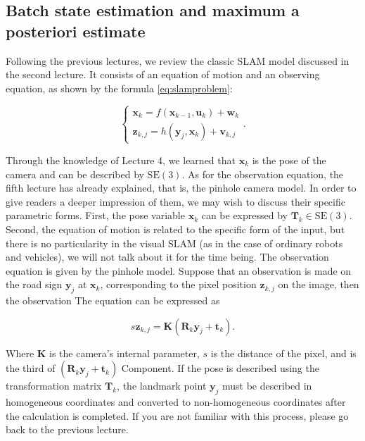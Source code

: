 \subsection{Batch state estimation and maximum a posteriori estimate}

Following the previous lectures, we review the classic SLAM model discussed in the second lecture. It consists of an equation of motion and an observing equation, as shown by the formula \eqref{eq:slamproblem}:

\begin{equation}
\left\{ \begin{array}{l}
{\bm{x}_k} = f\left( {{\bm{x}_{k - 1}},{\bm{u}_k}} \right) + \bm{w}_k\\
{\bm{z}_{k,j}} = h\left( {{ \bm{y}_j},{ \bm{x}_k}}  \right)+ \bm{v}_{k,j}
\end{array} \right. .
\end{equation}

Through the knowledge of Lecture 4, we learned that $\bm{x}_k$ is the pose of the camera and can be described by $\mathrm{SE}(3)$. As for the observation equation, the fifth lecture has already explained, that is, the pinhole camera model. In order to give readers a deeper impression of them, we may wish to discuss their specific parametric forms. First, the pose variable $\bm{x}_k$ can be expressed by $\bm{T}_k \in \mathrm{SE}(3) $. Second, the equation of motion is related to the specific form of the input, but there is no particularity in the visual SLAM (as in the case of ordinary robots and vehicles), we will not talk about it for the time being. The observation equation is given by the pinhole model. Suppose that an observation is made on the road sign $\bm{y}_j$ at $\bm{x}_k$, corresponding to the pixel position $\bm{z}_{k,j}$ on the image, then the observation The equation can be expressed as

\begin{equation}
s \bm{z}_{k,j}= \bm{K} (\bm{R}_k {\bm{y}_j}+\bm{t}_k).
\end{equation}

Where $\bm{K}$ is the camera's internal parameter, $s$ is the distance of the pixel, and is the third of $(\bm{R}_k {\bm{y}_j}+\bm{t}_k)$ Component. If the pose is described using the transformation matrix $\bm{T}_k$, the landmark point $\bm{y}_j$ must be described in homogeneous coordinates and converted to non-homogeneous coordinates after the calculation is completed. If you are not familiar with this process, please go back to the previous lecture.

